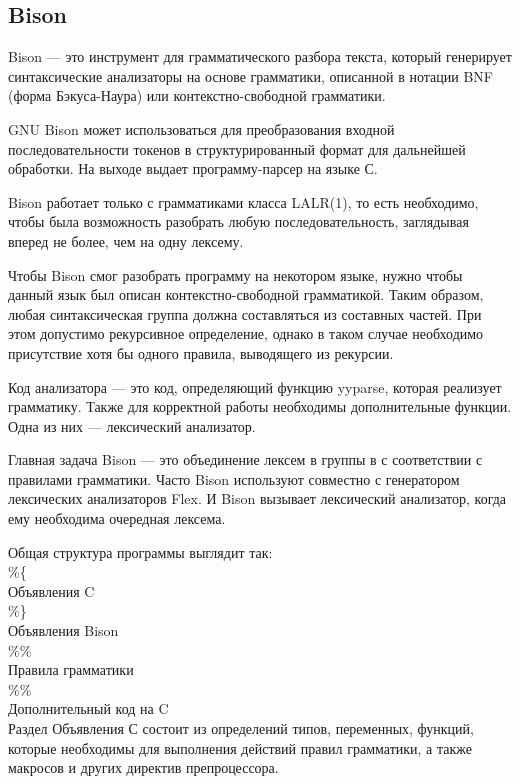 \documentclass[bachelor, och, coursework, times]{SCWorks}
\begin{document}
\subsection{Bison}

Bison --- это инструмент для грамматического разбора текста, который генерирует синтаксические анализаторы на основе грамматики, описанной в нотации BNF (форма Бэкуса-Наура) или контекстно-свободной грамматики.

GNU Bison может использоваться для преобразования входной последовательности токенов в структурированный формат для дальнейшей обработки. На выходе выдает программу-парсер на языке С.

Bison работает только с грамматиками класса LALR(1), то есть необходимо, чтобы была возможность разобрать любую последовательность, заглядывая вперед не более, чем на одну лексему.

Чтобы Bison смог разобрать программу на некотором языке, нужно чтобы данный язык был описан контекстно-свободной грамматикой. Таким образом, любая синтаксическая группа должна составляться из составных частей. При этом допустимо рекурсивное определение, однако в таком случае необходимо присутствие хотя бы одного правила, выводящего из рекурсии.

Код анализатора --- это код, определяющий функцию yyparse, которая реализует грамматику. Также для корректной работы необходимы дополнительные функции. Одна из них --- лексический анализатор.

Главная задача Bison --- это объединение лексем в группы в с соответствии с правилами грамматики. Часто Bison используют совместно с генератором лексических анализаторов Flex. И Bison вызывает лексический анализатор, когда ему необходима очередная лексема.

Общая структура программы выглядит так: \\
\%\{ \\
Объявления C \\
\%\} \\
Объявления Bison \\
\%\% \\
Правила грамматики \\
\%\% \\
Дополнительный код на C \\

Раздел Объявления С состоит из определений типов, переменных, функций, которые необходимы для выполнения действий правил грамматики, а также макросов и других директив препроцессора.
\end{document}
